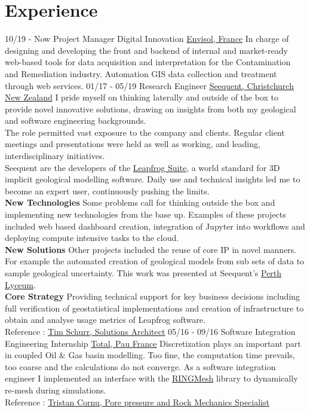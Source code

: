 \documentclass[]{friggeri-cv}
\begin{document}
\section{Experience}
\begin{entrylist}
  \entry
  {10/19 - Now}
  {Project Manager Digital Innovation}
  {\href{http://envisol.net/}{Envisol, France}}
  {In charge of designing and developing the front and backend of internal and market-ready web-based tools for data acquisition and interpretation for the Contamination and Remediation industry. Automation GIS data collection and treatment through web services.}
  \entry
    {01/17 - 05/19}
    {Research Engineer}
    {\href{https://www.seequent.com/}{Seequent, Christchurch New Zealand}}
    {I pride myself on thinking laterally and outside of the box to provide novel innovative solutions, drawing on insights from both my geological and software engineering backgrounds.
    \\[3pt]
    The role permitted vast exposure to the company and clients. Regular client meetings and presentations were held as well as working, and leading, interdisciplinary initiatives.
    \\[3pt]
    Seequent are the developers of the \href{https://www.leapfrog3d.com/}{Leapfrog Suite}, a world standard for 3D implicit geological modelling software. Daily use and technical insights led me to become an expert user, continuously pushing the limits.
    \\[6pt]
   	\textbf{New Technologies} Some problems call for thinking outside the box and implementing new technologies from the base up. Examples of these projects included web based dashboard creation, integration of Jupyter into workflows and deploying compute intensive tasks to the cloud.
   	\\[6pt]
   	\textbf{New Solutions} Other projects included the reuse of core IP in novel manners. For example the automated creation of geological models from sub sets of data to sample geological uncertainty. This work was presented at Seequent's \href{https://www.youtube.com/watch?v=jt26J5ljlA0}{Perth Lyceum}.
    \\[6pt]
   	\textbf{Core Strategy} Providing technical support for key business decisions including full verification of geostatistical implementations and creation of infrastructure to obtain and analyse usage metrics of Leapfrog software. 
    \\
    Reference : \href{mailto:tim.schurr@seequent.com}{Tim Schurr, Solutions Architect}
	}
  \entry
    {05/16 - 09/16}
    {Software Integration Engineering Internship}
    {\href{https://www.total.com/en}{Total, Pau France}}
    {Discretization plays an important part in coupled Oil \& Gas basin modelling. Too fine, the computation time prevails, too coarse and the calculations do not converge. As a software integration engineer I implemented an interface with the \href{http://www.ring-team.org/software/ringmesh}{RINGMesh} library to dynamically re-mesh during simulations.\\ Reference : \href{mailto:tristan.cornu@total.com}{Tristan Cornu, Pore pressure and Rock Mechanics Specialist}}
    \end{entrylist}
    
\end{document}
